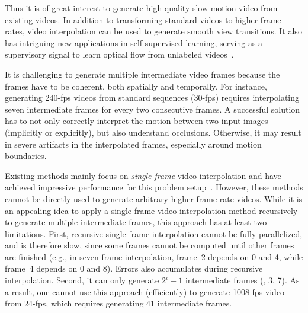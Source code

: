 \documentclass[10pt,twocolumn,letterpaper]{article}
\makeatletter
\def\fps{-fps\@\xspace}
\makeatother
\begin{document}
Thus it is of great interest to generate high-quality slow-motion video from existing videos. In addition to transforming standard videos to higher frame rates, video interpolation can be used to generate smooth view transitions. It also has intriguing new applications in self-supervised learning, serving as a supervisory signal to learn optical flow from unlabeled videos~\cite{liu17video,long16learning}.


It is challenging to generate multiple intermediate video frames because the frames have to be coherent, both spatially and temporally. For instance, generating 240\fps videos from standard sequences (30-fps) requires interpolating seven intermediate frames for every two consecutive frames. A successful solution has to not only correctly interpret the motion between two input images (implicitly or explicitly), but also understand occlusions. Otherwise, it may result in severe artifacts  in the interpolated frames, especially around motion boundaries. 

Existing methods mainly focus on \emph{single-frame} video interpolation and have achieved impressive performance for this problem setup~\cite{liu17video,long16learning,niklaus17video_cvpr,niklaus17video_iccv}. However, these methods cannot be directly used to generate arbitrary higher frame-rate videos. While it is an appealing idea to apply a single-frame video interpolation method recursively to generate multiple intermediate frames, this approach has at least two limitations. First, recursive single-frame interpolation cannot be fully parallelized, and is therefore slow, since some frames cannot be computed until other frames are finished (e.g., in seven-frame interpolation, frame~2 depends on 0 and 4, while frame~4 depends on 0 and 8).
 Errors also accumulates during recursive interpolation. Second, it can only generate $2^i\!-\!1$ intermediate frames (\eg, 3, 7). As a result, one cannot use this approach (efficiently) to generate 1008\fps video from 24\fps, which requires generating 41 intermediate frames. 
\end{document}
